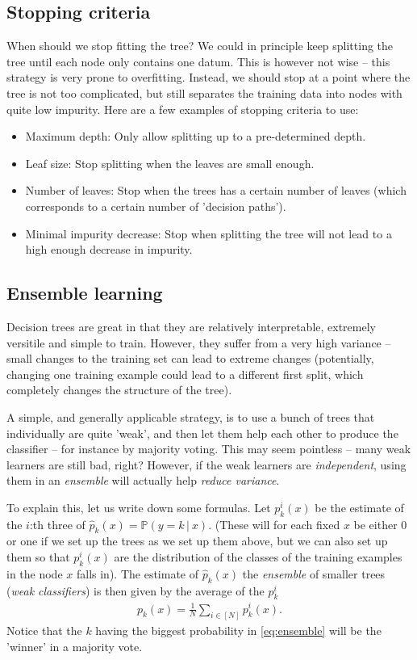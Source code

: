 \documentclass{article}
\begin{document}
\subsection{Stopping criteria}
When should we stop fitting the tree? We could in principle keep splitting the tree until each node only contains one datum. This is however not wise -- this strategy is very prone to overfitting. Instead, we should stop at a point where the tree is not too complicated, but still separates the training data into nodes with quite low impurity. Here are a few examples of stopping criteria to use:
\begin{itemize}
    \item Maximum depth: Only allow splitting up to a pre-determined depth.
    \item Leaf size: Stop splitting when the leaves are small enough.
    \item Number of leaves: Stop when the trees has a certain number of leaves (which corresponds to a certain number of 'decision paths').
    \item Minimal impurity decrease: Stop when splitting the tree will not lead to a high enough decrease in impurity.
\end{itemize}

\subsection{Ensemble learning}
Decision trees are great in that they are relatively interpretable, extremely versitile and simple to train. However, they suffer from a very high variance -- small changes to the training set can lead to extreme changes (potentially, changing one training example could lead to a different first split, which completely changes the structure of the tree).

A simple, and generally applicable strategy, is to use a bunch of trees that individually are quite 'weak', and then let them help each other to produce the classifier -- for instance by majority voting. This may seem pointless -- many weak learners are still bad, right? However, if the weak learners are \emph{independent}, using them in an \emph{ensemble} will actually help \emph{reduce variance}. 



To explain this, let us write down some formulas. Let $p_k^i(x)$ be the estimate of the $i$:th three of $\hat{p}_k(x) = \mathbb{P}(y=k \, \vert \ x)$. (These will for each fixed $x$ be either $0$ or one if we set up the trees as we set up them above, but we can also set up them so that $p_k^i(x)$ are the distribution of the classes of the training examples in the node $x$ falls in). The estimate of $\hat{p}_k(x)$ the \emph{ensemble} of smaller trees (\emph{weak classifiers}) is then given by the average of the $p_k^i$
\begin{align} \label{eq:ensemble}
    p_k(x) = \frac{1}{N}\sum_{i\in [N]}p_k^i(x).
\end{align}
Notice that the $k$ having the biggest probability in \eqref{eq:ensemble} will be the 'winner' in a majority vote.
\end{document}
